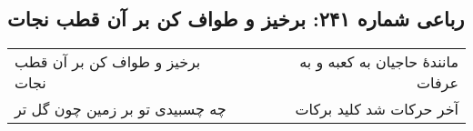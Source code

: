 \begin{center}
\section*{رباعی شماره ۲۴۱: برخیز و طواف کن بر آن قطب نجات}
\label{sec:0241}
\begin{longtable}{l p{0.5cm} r}
برخیز و طواف کن بر آن قطب نجات
&&
مانندهٔ حاجیان به کعبه و به عرفات
\\
چه چسبیدی تو بر زمین چون گل تر
&&
آخر حرکات شد کلید برکات
\\
\end{longtable}
\end{center}
